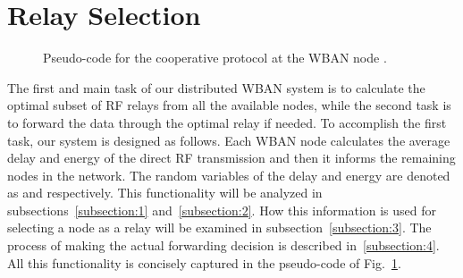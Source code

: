 \documentclass[10pt]{IEEEtran}
\newcounter{section:outage-analysis}
\begin{document}
\section{Relay Selection}
\label{section:relay-selection}
\begin{figure}[!htb]
\caption{Pseudo-code for the cooperative protocol at the WBAN node . }\label{fig:coop-protocol}
\end{figure}

The first and main task of our distributed WBAN system is to calculate the optimal subset of  RF relays from all the available nodes, while the second task is to forward the data through the optimal relay if needed. To accomplish the first task, our system is designed as follows. Each WBAN node  calculates the average delay and energy of the direct RF transmission and then it informs the remaining nodes in the network. The random variables of the delay and energy are denoted as   and  respectively. This functionality will be analyzed in subsections~\ref{subsection:1} and~\ref{subsection:2}. How this information is used for selecting a node as a relay will be examined in subsection~\ref{subsection:3}. The process of making the actual forwarding decision is described in~\ref{subsection:4}. All this functionality is concisely captured in the pseudo-code of Fig.~\ref{fig:coop-protocol}.
\end{document}
